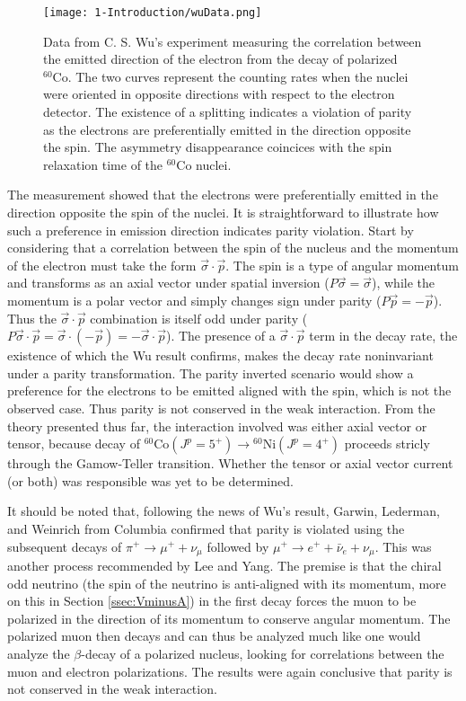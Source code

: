 \begin{figure}[h]
  \centering
  \texttt{[image: 1-Introduction/wuData.png]}  
  \caption{Data from C. S. Wu's experiment \cite{wu1957} measuring the correlation between the emitted
    direction of the electron from the decay of polarized $^{60}\mathrm{Co}$. The two
    curves represent the counting rates when the nuclei were oriented in opposite
    directions with respect to the electron detector. The existence of a splitting
    indicates a violation of parity as the electrons are preferentially emitted in the
    direction opposite the spin. The asymmetry disappearance coincices with the spin relaxation time
    of the $^{60}\mathrm{Co}$ nuclei.}
  \label{fig:wuData}
\end{figure}

The measurement showed that the electrons were preferentially
emitted in the direction opposite the spin of the nuclei. It is straightforward to illustrate
how such a preference in emission direction indicates parity violation. Start by considering that
a correlation between the spin of the nucleus and the momentum of the electron
must take the form $\vec{\sigma} \cdot \vec{p}$.
The spin is a type of angular momentum and transforms as an axial vector under spatial inversion
($P\vec{\sigma}=\vec{\sigma}$), while the momentum is a polar vector and
simply changes sign under parity ($P\vec{p}=-\vec{p}$). Thus the $\vec{\sigma} \cdot \vec{p}$
combination is itself odd under parity ($P\vec{\sigma} \cdot \vec{p} = \vec{\sigma} \cdot (-\vec{p}) = -\vec{\sigma} \cdot \vec{p}$).
The presence of
a $\vec{\sigma} \cdot \vec{p}$ term in the decay rate, the existence of which the Wu result confirms,
makes the
decay rate noninvariant under a parity transformation.
The parity inverted scenario would show a preference for the electrons to be emitted aligned
with the spin, which is not the observed case. Thus parity is not conserved in the
weak interaction.
From the theory presented thus far,
the interaction involved was either axial vector or tensor, because decay of
$^{60}\mathrm{Co} (J^p=5^+) \rightarrow {^{60}\mathrm{Ni}}(J^p=4^+)$ proceeds stricly through
the Gamow-Teller transition. Whether the tensor or axial vector current (or both) was responsible
was yet to be determined.

It should be noted that, following the news of Wu's result, Garwin, Lederman, and
Weinrich \cite{garwin1957} from Columbia confirmed
that parity is violated using the subsequent decays of $\pi^+ \rightarrow \mu^++\nu_\mu$
followed by $\mu^+ \rightarrow e^+ + \bar{\nu}_e + \nu_\mu$. This was another process
recommended by Lee and Yang. The premise is that the chiral odd neutrino (the spin of the neutrino
is anti-aligned with its momentum, more on this in Section \ref{ssec:VminusA}) in the first decay
forces the muon to be polarized in the direction of its momentum to conserve angular
momentum. The polarized muon then decays and can thus be analyzed much like one would analyze the
$\beta$-decay of a polarized nucleus, looking for correlations between the muon and
electron polarizations. The results were again conclusive that parity is not conserved in the weak
interaction.

